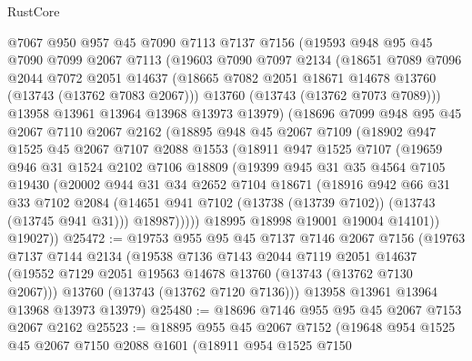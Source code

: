 \begin{lexlean}{RustCore}
\begin{coremodule}
    @7067
    @950
    @957
    @45
    @7090
    @7113
    @7137
    @7156
    (@19593
      @948
      @95
      @45
      @7090
      @7099
      @2067
      @7113
      (@19603
        @7090
        @7097
        @2134
        (@18651
          @7089
          @7096
          @2044
          @7072
          @2051
          @14637
          (@18665 @7082 @2051 @18671 @14678 @13760 (@13743 (@13762 @7083 @2067)))
          @13760
          (@13743 (@13762 @7073 @7089)))
        @13958
        @13961
        @13964
        @13968
        @13973
        @13979)
      (@18696
        @7099
        @948
        @95
        @45
        @2067
        @7110
        @2067
        @2162
        (@18895
          @948
          @45
          @2067
          @7109
          (@18902
            @947
            @1525
            @45
            @2067
            @7107
            @2088
            @1553
            (@18911
              @947
              @1525
              @7107
              (@19659
                @946
                @31
                @1524
                @2102
                @7106
                @18809
                (@19399
                  @945
                  @31
                  @35
                  @4564
                  @7105
                  @19430
                  (@20002
                    @944
                    @31
                    @34
                    @2652
                    @7104
                    @18671
                    (@18916
                      @942
                      @66
                      @31
                      @33
                      @7102
                      @2084
                      (@14651 @941 @7102 (@13738 (@13739 @7102)) (@13743 (@13745 @941 @31)))
                      @18987)))))
            @18995
            @18998
            @19001
            @19004
            @14101))
        @19027))
@25472 := @19753
    @955
    @95
    @45
    @7137
    @7146
    @2067
    @7156
    (@19763
      @7137
      @7144
      @2134
      (@19538
        @7136
        @7143
        @2044
        @7119
        @2051
        @14637
        (@19552 @7129 @2051 @19563 @14678 @13760 (@13743 (@13762 @7130 @2067)))
        @13760
        (@13743 (@13762 @7120 @7136)))
      @13958
      @13961
      @13964
      @13968
      @13973
      @13979)
@25480 := @18696 @7146 @955 @95 @45 @2067 @7153 @2067 @2162
@25523 := @18895
    @955
    @45
    @2067
    @7152
    (@19648
      @954
      @1525
      @45
      @2067
      @7150
      @2088
      @1601
      (@18911
        @954
        @1525
        @7150

\end{coremodule}
\end{lexlean}
